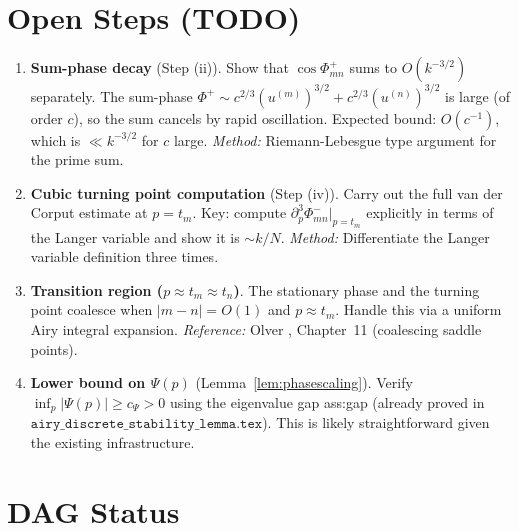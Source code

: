\documentclass[12pt,a4paper]{amsart}
\theoremstyle{definition}
\newcommand{\Phase}{\Phi}          %
\begin{document}
\section{Open Steps (TODO)}
\label{sec:todo}

\begin{enumerate}
\item[\textbf{T1}] \textbf{Sum-phase decay} (Step (ii)).
  Show that $\cos\Phase^+_{mn}$ sums to $O(k^{-3/2})$ separately.
  The sum-phase $\Phase^+ \sim c^{2/3}(u^{(m)})^{3/2} + c^{2/3}(u^{(n)})^{3/2}$
  is large (of order $c$), so the sum cancels by rapid oscillation.
  Expected bound: $O(c^{-1})$, which is $\ll k^{-3/2}$ for $c$ large.
  \emph{Method:} Riemann-Lebesgue type argument for the prime sum.

\item[\textbf{T2}] \textbf{Cubic turning point computation} (Step (iv)).
  Carry out the full van der Corput estimate at $p = t_m$.
  Key: compute $\partial_p^3 \Phase^-_{mn}|_{p = t_m}$ explicitly
  in terms of the Langer variable and show it is $\sim k/N$.
  \emph{Method:} Differentiate the Langer variable definition three times.

\item[\textbf{T3}] \textbf{Transition region ($ p \approx t_m \approx t_n $)}.
  The stationary phase and the turning point coalesce when $|m-n| = O(1)$
  and $p \approx t_m$. Handle this via a uniform Airy integral expansion.
  \emph{Reference:} Olver \cite{Olver1974}, Chapter~11 (coalescing saddle points).

\item[\textbf{T4}] \textbf{Lower bound on $\Psi(p)$} (Lemma~\ref{lem:phasescaling}).
  Verify $\inf_p |\Psi(p)| \ge c_\Psi > 0$ using the eigenvalue gap
  ass:gap (already proved in $\mathtt{airy\_discrete\_stability\_lemma.tex}$).
  This is likely straightforward given the existing infrastructure.
\end{enumerate}

\section{DAG Status}
\label{sec:dag}
\end{document}
